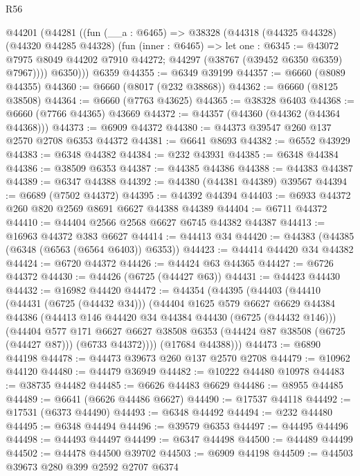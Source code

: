 \begin{lexlean}{R56}
\begin{coremodule}
    @44201
      (@44281
        ((fun (__a : @6465) =>
        @38328
          (@44318
            (@44325 @44328)
            (@44320 @44285 @44328)
            (fun (inner : @6465) =>
            let one : @6345 := @43072 @7975 @8049 @44202 @7910 @44272;
            @44297 (@38767 (@39452 @6350 @6359) @7967))))
          @6350)))
    @6359
@44355 := @6349 @39199
@44357 := @6660 (@8089 @44355)
@44360 := @6660 (@8017 (@232 @38868))
@44362 := @6660 (@8125 @38508)
@44364 := @6660 (@7763 @43625)
@44365 := @38328 @6403
@44368 := @6660 (@7766 @44365) @43669
@44372 := @44357 (@44360 (@44362 (@44364 @44368)))
@44373 := @6909 @44372
@44380 := @44373 @39547 @260 @137 @2570 @2708 @6353 @44372
@44381 := @6641 @8693
@44382 := @6552 @43929
@44383 := @6348 @44382
@44384 := @232 @43931
@44385 := @6348 @44384
@44386 := @38509 @6353
@44387 := @44385 @44386
@44388 := @44383 @44387
@44389 := @6347 @44388
@44392 := @44380 (@44381 @44389) @39567
@44394 := @6689 (@7502 @44372)
@44395 := @44392 @44394
@44403 := @6933 @44372 @260 @820 @2569 @8691 @6627 @44388 @44389
@44404 := @6711 @44372
@44410 := @44404 @2566 @2568 @6627 @6745 @44382 @44387
@44413 := @16963 @44372 @383 @6627
@44414 := @44413 @34
@44420 := @44383 (@44385 (@6348 (@6563 (@6564 @6403)) @6353))
@44423 := @44414 @44420 @34 @44382
@44424 := @6720 @44372
@44426 := @44424 @63 @44365
@44427 := @6726 @44372
@44430 := @44426 (@6725 (@44427 @63))
@44431 := @44423 @44430
@44432 := @16982 @44420
@44472 := @44354
    (@44395
      (@44403
        (@44410
          (@44431 (@6725 (@44432 @34)))
          (@44404
            @1625
            @579
            @6627
            @6629
            @44384
            @44386
            (@44413 @146 @44420 @34 @44384 @44430 (@6725 (@44432 @146)))
            (@44404
              @577
              @171
              @6627
              @6627
              @38508
              @6353
              (@44424 @87 @38508 (@6725 (@44427 @87)))
              (@6733 @44372))))
        (@17684 @44388)))
@44473 := @6890 @44198
@44478 := @44473 @39673 @260 @137 @2570 @2708
@44479 := @10962 @44120
@44480 := @44479 @36949
@44482 := @10222 @44480 @10978
@44483 := @38735 @44482
@44485 := @6626 @44483 @6629
@44486 := @8955 @44485
@44489 := @6641 (@6626 @44486 @6627)
@44490 := @17537 @44118
@44492 := @17531 (@6373 @44490)
@44493 := @6348 @44492
@44494 := @232 @44480
@44495 := @6348 @44494
@44496 := @39579 @6353
@44497 := @44495 @44496
@44498 := @44493 @44497
@44499 := @6347 @44498
@44500 := @44489 @44499
@44502 := @44478 @44500 @39702
@44503 := @6909 @44198
@44509 := @44503 @39673 @280 @399 @2592 @2707 @6374

\end{coremodule}
\end{lexlean}
